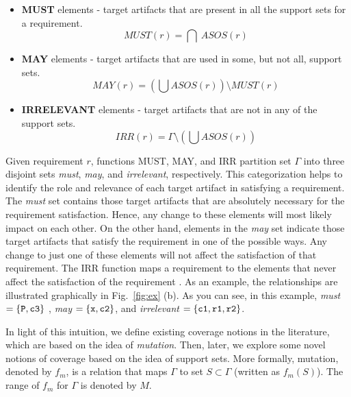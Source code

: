 \begin{itemize}
  \item \textbf{MUST} elements - target artifacts that are present in all the support sets for a requirement.
      $$ MUST (r) = \bigcap \ ASOS(r) $$

  \item \textbf{MAY} elements - target artifacts that are used in some, but not all, support sets.
      $$MAY(r) = (\bigcup ASOS (r)) \setminus MUST (r) $$

  \item \textbf{IRRELEVANT} elements - target artifacts that are not in any of the support sets. $$IRR(r) = \Gamma \setminus (\bigcup ASOS (r))$$
\end{itemize}

Given requirement $r$, functions MUST, MAY, and IRR partition set $\Gamma$ into three disjoint sets \emph{must}, \emph{may}, and \emph{irrelevant}, respectively. This categorization helps to identify the role and relevance of each target artifact in satisfying a requirement. The \emph{must} set contains those target artifacts that are absolutely necessary for the requirement satisfaction. Hence, any change to these elements will most likely impact on each other. On the other hand, elements in the \emph{may} set indicate those target artifacts that satisfy the requirement in one of the possible ways.  Any change to just one of these elements will not affect the satisfaction of that requirement. The IRR function maps a requirement to the elements that never affect the satisfaction of the requirement \cite{Murugesan16:renext}. As an example, the relationships are illustrated graphically in Fig.~\ref{fig:ex} (b). As you can see, in this example, 
\emph{must} $= \{ {\tt P}, {\tt c3}\}$ ,
\emph{may} $= \{ {\tt x}, {\tt c2}\}$, and \emph{irrelevant} $= \{ {\tt c1}, {\tt r1}, {\tt r2}\}$.


In light of this intuition, we define existing coverage notions in the literature, which are based on the idea of \emph{mutation}. Then, later, we explore some novel notions of coverage based on the idea of support sets.  More formally, mutation, denoted by $f_m$, is a relation that maps $\Gamma$ to set $S \subset \Gamma$ (written as $f_m (S)$). The range of $f_m$ for $\Gamma$ is denoted by $M$.

